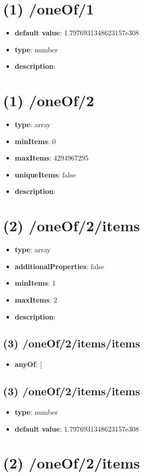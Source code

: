 \section{(1) /oneOf/1}
\begin{itemize}[leftmargin=1em]\item {\bf default value}: 1.7976931348623157e308
\item {\bf type}: number
\item {\bf description}: 
\end{itemize}\section{(1) /oneOf/2}
\begin{itemize}[leftmargin=1em]\item {\bf type}: array
\item {\bf minItems}: 0
\item {\bf maxItems}: 4294967295
\item {\bf uniqueItems}: false
\item {\bf description}: 
\end{itemize}\section{(2) /oneOf/2/items}
\begin{itemize}[leftmargin=2em]\item {\bf type}: array
\item {\bf additionalProperties}: false
\item {\bf minItems}: 1
\item {\bf maxItems}: 2
\item {\bf description}: 
\end{itemize}\subsection{(3) /oneOf/2/items/items}
\begin{itemize}[leftmargin=3em]\item {\bf anyOf}: [\end{itemize}\subsection{(3) /oneOf/2/items/items}
\begin{itemize}[leftmargin=3em]\item {\bf type}: number\item {\bf default value}: 1.7976931348623157e308
\end{itemize}\section{(2) /oneOf/2/items}
